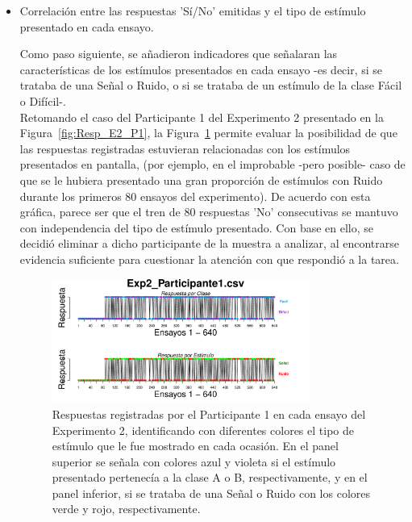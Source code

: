 \begin{itemize}
	\item Correlación entre las respuestas 'Sí/No' emitidas y el tipo de estímulo presentado en cada ensayo.

Como paso siguiente, se añadieron indicadores que señalaran las características de los estímulos presentados en cada ensayo -es decir, si se trataba de una Señal o Ruido, o si se trataba de un estímulo de la clase Fácil o Difícil-.\\ 

Retomando el caso del Participante 1 del Experimento 2 presentado en la Figura~\ref{fig:Resp_E2_P1}, la Figura~\ref{fig:BiasResp_E1_P1} permite evaluar la posibilidad de que las respuestas registradas estuvieran relacionadas con los estímulos presentados en pantalla, (por ejemplo, en el improbable -pero posible- caso de que se le hubiera presentado una gran proporción de estímulos con Ruido durante los primeros 80 ensayos del experimento). De acuerdo con esta gráfica, parece ser que el tren de 80 respuestas 'No' consecutivas se mantuvo con independencia del tipo de estímulo presentado. Con base en ello, se decidió eliminar a dicho participante de la muestra a analizar, al encontrarse evidencia suficiente para cuestionar la atención con que respondió a la tarea.\\

\begin{figure}[th]
\centering
\includegraphics[width=0.80\textwidth]{Figures/BiasResp_Exp2_P1} 
\caption[Explorando datos individuales (ejemplo): Relación entre la respuesta emitida y el tipo de ensayo]{Respuestas registradas por el Participante 1 en cada ensayo del Experimento 2, identificando con diferentes colores el tipo de estímulo que le fue mostrado en cada ocasión. En el panel superior se señala con colores azul y violeta si el estímulo presentado pertenecía a la clase A o B, respectivamente, y en el panel inferior, si se trataba de una Señal o Ruido con los colores verde y rojo, respectivamente.}
\label{fig:BiasResp_E1_P1}
\end{figure}


\end{itemize}
